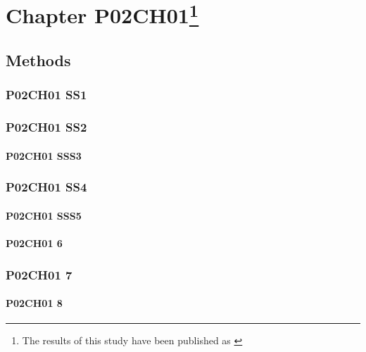\chapter[Chapter P02CH01]{Chapter P02CH01\protect\footnote{The results of this study have been published as \citep{T40}}}\label{ch:FD} %

\lipsum[1]


\section{Methods}
\subsection{P02CH01 SS1}
\lipsum[1]

\subsection{P02CH01 SS2}
\lipsum[1]

\subsubsection{P02CH01 SSS3}
\lipsum[1]

\subsection{P02CH01 SS4}\label{sec:FD_best}

\subsubsection{P02CH01 SSS5}
\lipsum[1-4]

\subsubsection{P02CH01 6}
\lipsum[1-4]


\subsection{P02CH01 7}
\lipsum[1-4]


\subsubsection{P02CH01 8}
\lipsum[1-4]

